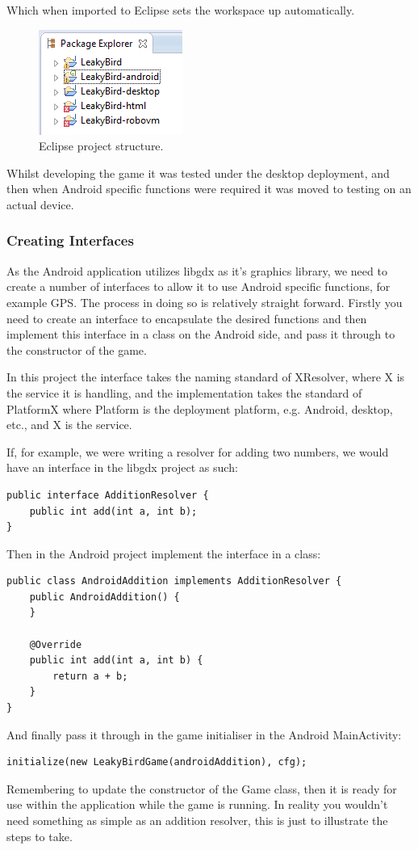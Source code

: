 Which when imported to Eclipse sets the workspace up automatically.

\begin{figure}[h!]
\centering\includegraphics{implementation/figures/gdx-setup-3.png}
\caption{Eclipse project structure.}
\end{figure}

Whilst developing the game it was tested under the desktop deployment, and then when Android specific functions were required it was moved to testing on an actual device.

\subsubsection{Creating Interfaces}
As the Android application utilizes libgdx as it’s graphics library, we need to create a number of interfaces to allow it to use Android specific functions, for example GPS. The process in doing so is relatively straight forward. Firstly you need to create an interface to encapsulate the desired functions and then implement this interface in a class on the Android  side, and pass it through to the constructor of the game. 

In this project the interface takes the naming standard of XResolver, where X is the service it is handling, and the implementation takes the standard of PlatformX where Platform is the deployment platform, e.g. Android, desktop, etc., and X is the service.

If, for example, we were writing a resolver for adding two numbers, we would have an interface in the libgdx project as such:
\begin{verbatim}
public interface AdditionResolver {
    public int add(int a, int b);
}
\end{verbatim}
Then in the Android project implement the interface in a class:
\begin{verbatim}
public class AndroidAddition implements AdditionResolver {
    public AndroidAddition() {
    }

    @Override
    public int add(int a, int b) {
        return a + b;
    }
}
\end{verbatim}
And finally pass it through in the game initialiser in the Android MainActivity:
\begin{verbatim}
initialize(new LeakyBirdGame(androidAddition), cfg);
\end{verbatim}
Remembering to update the constructor of the Game class, then it is ready for use within the application while the game is running. In reality you wouldn’t need something as simple as an addition resolver, this is just to illustrate the steps to take.

